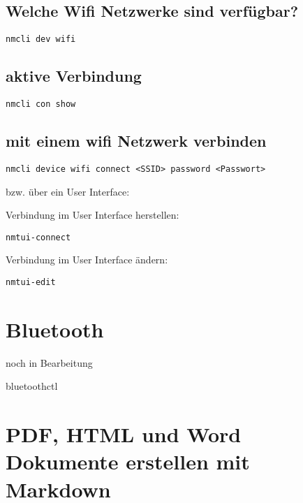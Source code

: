 \documentclass[]{book}
\begin{document}
\hypertarget{welche-wifi-netzwerke-sind-verfugbar}{%
\section{Welche Wifi Netzwerke sind verfügbar?}\label{welche-wifi-netzwerke-sind-verfugbar}}

\begin{verbatim}
nmcli dev wifi
\end{verbatim}

\hypertarget{aktive-verbindung}{%
\section{aktive Verbindung}\label{aktive-verbindung}}

\begin{verbatim}
nmcli con show
\end{verbatim}

\hypertarget{mit-einem-wifi-netzwerk-verbinden}{%
\section{mit einem wifi Netzwerk verbinden}\label{mit-einem-wifi-netzwerk-verbinden}}

\begin{verbatim}
nmcli device wifi connect <SSID> password <Passwort>
\end{verbatim}

bzw. über ein User Interface:

Verbindung im User Interface herstellen:

\begin{verbatim}
nmtui-connect
\end{verbatim}

Verbindung im User Interface ändern:

\begin{verbatim}
nmtui-edit
\end{verbatim}

\hypertarget{bluetooth}{%
\chapter{Bluetooth}\label{bluetooth}}

noch in Bearbeitung

bluetoothctl

\hypertarget{pdf-html-und-word-dokumente-erstellen-mit-markdown}{%
\chapter{PDF, HTML und Word Dokumente erstellen mit Markdown}\label{pdf-html-und-word-dokumente-erstellen-mit-markdown}}
\end{document}
